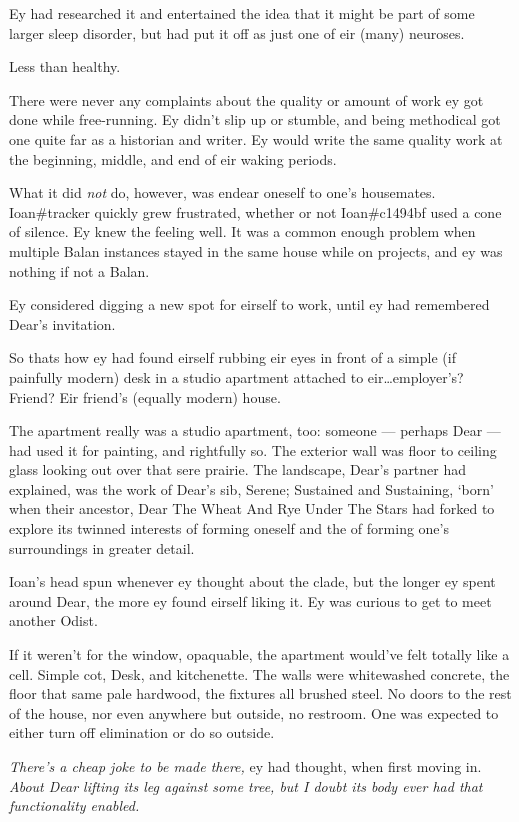 Ey had researched it and entertained the idea that it might be part of some larger sleep disorder, but had put it off as just one of eir (many) neuroses.

Less than healthy.

There were never any complaints about the quality or amount of work ey got done while free-running. Ey didn't slip up or stumble, and being methodical got one quite far as a historian and writer. Ey would write the same quality work at the beginning, middle, and end of eir waking periods.

What it did \emph{not} do, however, was endear oneself to one's housemates. Ioan\#tracker quickly grew frustrated, whether or not Ioan\#c1494bf used a cone of silence. Ey knew the feeling well. It was a common enough problem when multiple Balan instances stayed in the same house while on projects, and ey was nothing if not a Balan.

Ey considered digging a new spot for eirself to work, until ey had remembered Dear's invitation.

So thats how ey had found eirself rubbing eir eyes in front of a simple (if painfully modern) desk in a studio apartment attached to eir\ldots{}employer's? Friend? Eir friend's (equally modern) house.

The apartment really was a studio apartment, too: someone --- perhaps Dear --- had used it for painting, and rightfully so. The exterior wall was floor to ceiling glass looking out over that sere prairie. The landscape, Dear's partner had explained, was the work of Dear's sib, Serene; Sustained and Sustaining, `born' when their ancestor, Dear The Wheat And Rye Under The Stars had forked to explore its twinned interests of forming oneself and the of forming one's surroundings in greater detail.

Ioan's head spun whenever ey thought about the clade, but the longer ey spent around Dear, the more ey found eirself liking it. Ey was curious to get to meet another Odist.

If it weren't for the window, opaquable, the apartment would've felt totally like a cell. Simple cot, Desk, and kitchenette. The walls were whitewashed concrete, the floor that same pale hardwood, the fixtures all brushed steel. No doors to the rest of the house, nor even anywhere but outside, no restroom. One was expected to either turn off elimination or do so outside.

\emph{There's a cheap joke to be made there,} ey had thought, when first moving in. \emph{About Dear lifting its leg against some tree, but I doubt its body ever had that functionality enabled.}

